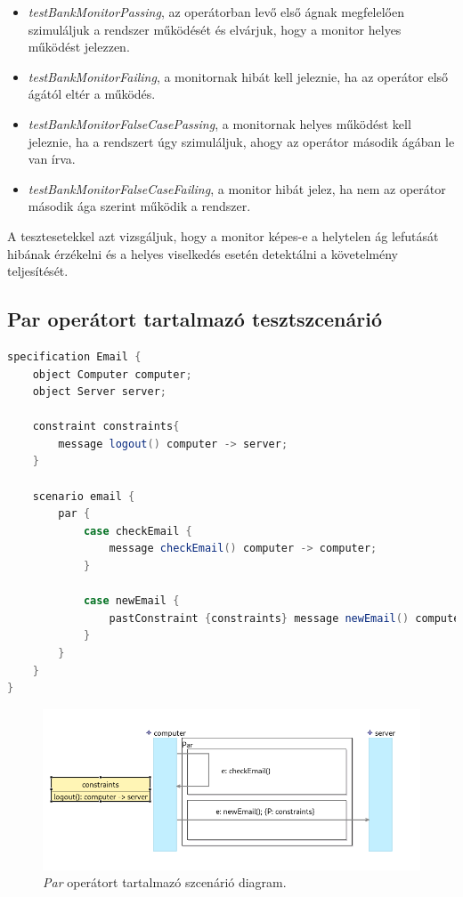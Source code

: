 \begin{itemize}
    \item \textit{testBankMonitorPassing}, az operátorban levő első ágnak megfelelően szimuláljuk a rendszer működését és elvárjuk, hogy a monitor helyes működést jelezzen.
    \item \textit{testBankMonitorFailing}, a monitornak hibát kell jeleznie, ha az operátor első ágától eltér a működés.
    \item \textit{testBankMonitorFalseCasePassing}, a monitornak helyes működést kell jeleznie, ha a rendszert úgy szimuláljuk, ahogy az operátor második ágában le van írva.
    \item \textit{testBankMonitorFalseCaseFailing}, a monitor hibát jelez, ha nem az operátor második ága szerint működik a rendszer.
\end{itemize}

A tesztesetekkel azt vizsgáljuk, hogy a monitor képes-e a helytelen ág lefutását hibának érzékelni és a helyes viselkedés esetén detektálni a követelmény teljesítését.

\subsection{Par operátort tartalmazó tesztszcenárió}

\begin{lstlisting}[language=java, frame=single, float=ht!, caption={\textit{Par} operátort tartalmazó tesztszcenárió.},captionpos=b,label=test_par_scenario]
specification Email {
    object Computer computer;
    object Server server;

    constraint constraints{
        message logout() computer -> server;
    }

    scenario email {
        par {
            case checkEmail {
                message checkEmail() computer -> computer;
            }

            case newEmail {
                pastConstraint {constraints} message newEmail() computer -> server;
            }
        }
    }
}
\end{lstlisting}

\begin{figure}[!ht]
    \centering
    \includegraphics[width=150mm, keepaspectratio]{figures/diagramParExample.png}
    \caption{\textit{Par} operátort tartalmazó szcenárió diagram.}
    \label{test_par_diagram}
\end{figure}

